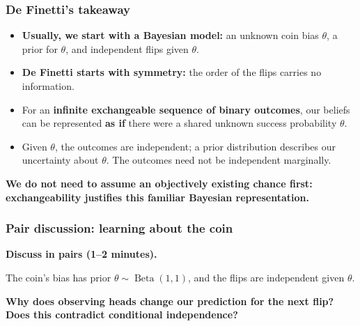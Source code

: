 \documentclass[10pt]{beamer}
\begin{document}
\begin{frame}

\frametitle{De Finetti's takeaway}

  \begin{itemize}
  \item \textbf{Usually, we start with a Bayesian model:} an unknown
    coin bias $\theta$, a prior for $\theta$, and independent flips
    given $\theta$.
  \item \textbf{De Finetti starts with symmetry:} the order of the
    flips carries no information.
  \item For an \textbf{infinite exchangeable sequence of binary outcomes},
    our beliefs can be represented \textbf{as if} there were a shared
    unknown success probability $\theta$.
  \item Given $\theta$, the outcomes are independent; a prior
    distribution describes our uncertainty about $\theta$.
    The outcomes need not be independent marginally.
  \end{itemize}

  \medskip
  \textbf{We do not need to assume an objectively existing chance first:
    exchangeability justifies this familiar Bayesian representation.}

\end{frame}

\begin{frame}
\frametitle{Pair discussion: learning about the coin}

  {\color{uured}\textbf{Discuss in pairs (1--2 minutes).}}

  The coin's bias has prior $\theta\sim\operatorname{Beta}(1,1)$,
  and the flips are independent given $\theta$.

  \textbf{Why does observing heads change our prediction for the next
    flip? Does this contradict conditional independence?}

\end{frame}
\end{document}
